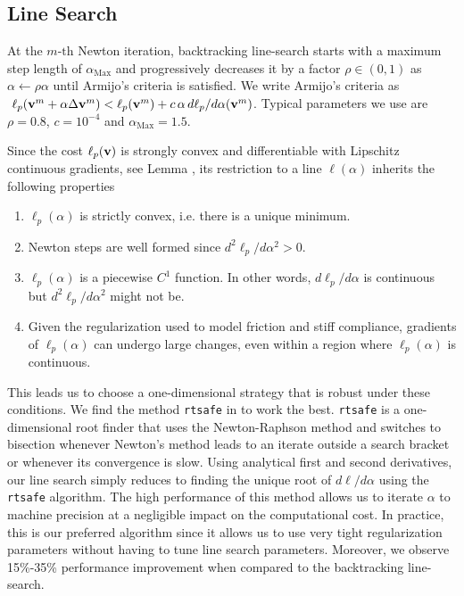 \subsection{Line Search}

At the $m\text{-th}$ Newton iteration, backtracking line-search starts with a
maximum step length of $\alpha_\text{Max}$ and progressively decreases it
by a factor $\rho \in (0, 1)$ as $\alpha\gets\rho\alpha$ until Armijo's
criteria \cite[\S 3.1]{bib:nocedal2006numerical} is satisfied. We write Armijo's
criteria as $~\ell_p({\mathbf{v}}^m + \alpha \Delta{\mathbf{v}}^{m}) < \ell_p({\mathbf{v}}^m) +
c\,\alpha\,d\ell_p/d\alpha({\mathbf{v}}^m)$. Typical parameters we use are
$\rho=0.8$, $c=10^{-4}$ and $\alpha_\text{Max}=1.5$.

Since the cost $\ell_p({\mathbf{v}})$ is strongly convex and differentiable with
Lipschitz continuous gradients, see Lemma , its restriction to a line $\ell(\alpha)$ inherits the following
properties
\begin{enumerate}
	\item $\ell_p(\alpha)$ is strictly convex, i.e. there is a unique minimum.
	\item Newton steps are well formed since $d^2\ell_p/d\alpha^2>0$.
	\item $\ell_p(\alpha)$ is a piecewise $C^1$ function. In other words,
	$d\ell_p/d\alpha$ is continuous but $d^2\ell_p/d\alpha^2$ might not be.	
	\item Given the regularization used to model friction and stiff compliance,
	gradients of $\ell_p(\alpha)$ can undergo large changes, even within a
	region where $\ell_p(\alpha)$ is continuous.
\end{enumerate}

This leads us to choose a one-dimensional strategy that is robust under these
conditions. We find the method \verb;rtsafe; in \cite[\S
9.4]{bib:numerical_recipes} to work the best. \verb;rtsafe; is a one-dimensional
root finder that uses the Newton-Raphson method and switches to bisection
whenever Newton's method leads to an iterate outside a search bracket or
whenever its convergence is slow. Using analytical first and second derivatives,
our line search simply reduces to finding the unique root of $d\ell/d\alpha$
using the \verb;rtsafe; algorithm. The high performance of this method allows us 
to iterate $\alpha$ to machine precision at a negligible impact on the
computational cost. In practice, this is our preferred algorithm since it allows
us to use very tight regularization parameters without having to tune line search parameters. Moreover, we observe 15\%-35\% performance improvement when
compared to the backtracking line-search.

